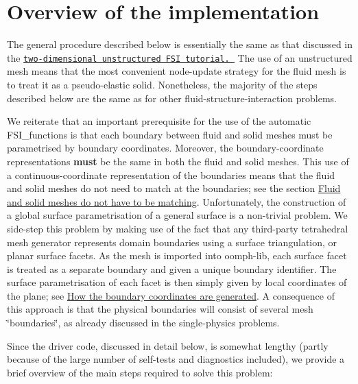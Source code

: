  

\hypertarget{index_overview_implementation}{}\section{Overview of the implementation}\label{index_overview_implementation}
The general procedure described below is essentially the same as that discussed in the \href{../../unstructured_fsi/html/index.html}{\tt two-\/dimensional unstructured F\+SI tutorial. } The use of an unstructured mesh means that the most convenient node-\/update strategy for the fluid mesh is to treat it as a pseudo-\/elastic solid. Nonetheless, the majority of the steps described below are the same as for other fluid-\/structure-\/interaction problems.

We reiterate that an important prerequisite for the use of the automatic {\ttfamily F\+S\+I\+\_\+functions} is that each boundary between fluid and solid meshes must be parametrised by boundary coordinates. Moreover, the boundary-\/coordinate representations {\bfseries  must } be the same in both the fluid and solid meshes. This use of a continuous-\/coordinate representation of the boundaries means that the fluid and solid meshes do not need to match at the boundaries; see the section \hyperlink{index_matching_fluid_and_solid}{Fluid and solid meshes do not have to be matching}. Unfortunately, the construction of a global surface parametrisation of a general surface is a non-\/trivial problem. We side-\/step this problem by making use of the fact that any third-\/party tetrahedral mesh generator represents domain boundaries using a surface triangulation, or planar surface facets. As the mesh is imported into {\ttfamily oomph-\/lib}, each surface facet is treated as a separate boundary and given a unique boundary identifier. The surface parametrisation of each facet is then simply given by local coordinates of the plane; see \hyperlink{index_boundary_coord}{How the boundary coordinates are generated}. A consequence of this approach is that the physical boundaries will consist of several mesh \char`\"{}boundaries\char`\"{}, as already discussed in the single-\/physics problems.

Since the driver code, discussed in detail below, is somewhat lengthy (partly because of the large number of self-\/tests and diagnostics included), we provide a brief overview of the main steps required to solve this problem\+: ~\newline
~\newline

